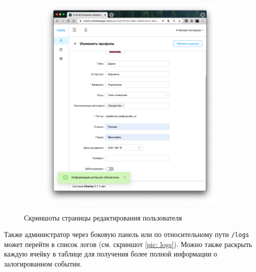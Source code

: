 \documentclass[a4paper,12pt,reqno]{article}
\begin{document}
\begin{figure}[H]
\begin{subfigure}[b]{0.475\linewidth}
			\includegraphics[width=\linewidth]{img/ro/user_upd_success.png}
		\end{subfigure}
		\caption{Скриншоты страницы редактирования пользователя}
		\label{pic: user}
	\end{figure}
	
	Также администратор через боковую панель или по относительному пути \texttt{/logs} может перейти в список логов (см. скриншот \ref{pic: logs}). Можно также раскрыть каждую ячейку в таблице для получения более полной информации о залогированном событии.
	
\end{document}
